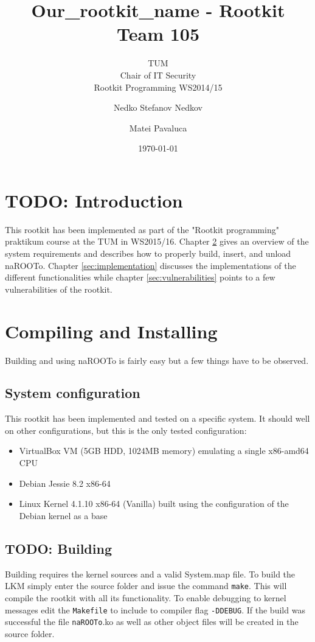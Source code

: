 \documentclass[10pt, letterpaper]{scrartcl}
\title{Our\_rootkit\_name - Rootkit Team 105}
\subtitle{TUM \\Chair of IT Security\\  Rootkit Programming WS2014/15}
\author{Nedko Stefanov Nedkov \and Matei Pavaluca}
\date{\today}
\begin{document}
\maketitle
\tableofcontents
\newpage

\section{TODO: Introduction}
This rootkit has been implemented as part of the "Rootkit programming" praktikum
course at the TUM in WS2015/16. 
Chapter \ref{sec:compiling_and_installing} gives an overview of the system requirements and describes how to properly build, insert, and unload naROOTo.
Chapter \ref{sec:implementation} discusses the implementations of the different functionalities while chapter \ref{sec:vulnerabilities} points to a few vulnerabilities of the rootkit.

\section{Compiling and Installing}\label{sec:compiling_and_installing}
Building and using naROOTo is fairly easy but a few things have to be observed.
\subsection{System configuration}
This rootkit has been implemented and tested on a specific system. It should
well on other configurations, but this is the only tested configuration:
\begin{itemize}
    \item VirtualBox VM (5GB HDD, 1024MB memory) emulating a single x86-amd64 CPU
    \item Debian Jessie 8.2 x86-64
    \item Linux Kernel 4.1.10 x86-64 (Vanilla) built using the configuration of the Debian kernel as a base
\end{itemize}

\subsection{TODO: Building}
Building requires the kernel sources and a valid System.map file. To build the LKM simply enter the source folder and issue the command \texttt{make}.
This will compile the rootkit with all its functionality. To enable debugging to kernel messages edit the \texttt{Makefile} to include to compiler flag \texttt{-DDEBUG}.
If the build was successful the file \texttt{naROOTo}.ko as well as other object files will be created in the source folder.
\end{document}
